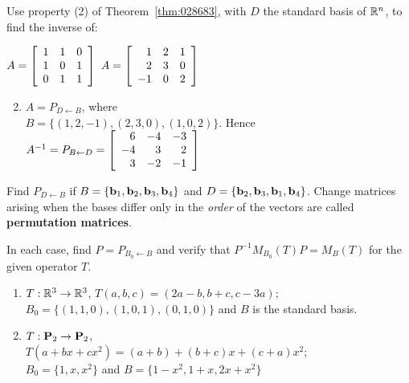 \begin{multicols}{2}
\begin{ex}
Use property (2) of Theorem~\ref{thm:028683}, with $D$ the standard basis of $\mathbb{R}^n$, to find the inverse of:
\begin{exenumerate}
\exitem $A = \left[ \begin{array}{rrr} 1 & 1 & 0 \\ 1 & 0 & 1 \\ 0 & 1 & 1 \end{array} \right]$
\exitem $A = \left[ \begin{array}{rrr} 1 & 2 & 1 \\ 2 & 3 & 0 \\ -1 & 0 & 2 \end{array} \right]$
\end{exenumerate}
\begin{sol}
\begin{enumerate}[label={\alph*.}]
\setcounter{enumi}{1}
\item $A = P_{D \gets B}$, where \\ $B = \{(1, 2, -1), (2, 3, 0), (1, 0, 2)\}$.
Hence $A^{-1} = P_{B \gets D} = \left[ \begin{array}{rrr} 6 & -4 & -3 \\ -4 & 3 & 2 \\ 3 & -2 & -1 \end{array} \right]$
\end{enumerate}
\end{sol}
\end{ex}

\begin{ex}
Find $P_{D \gets B}$ if $B = \{\textbf{b}_{1}, \textbf{b}_{2}, \textbf{b}_{3}, \textbf{b}_{4}\}$ and $D = \{\textbf{b}_{2}, \textbf{b}_{3}, \textbf{b}_{1}, \textbf{b}_{4}\}$. Change matrices arising when the bases differ only in the \textit{order} of the vectors are called \textbf{permutation matrices}.
\end{ex}

\begin{ex}
In each case, find $P = P_{B_0 \gets B}$ and verify that $P^{-1}M_{B_0}(T)P = M_B(T)$ for the given operator $T$.


\begin{enumerate}[label={\alph*.}]
\item $T : \mathbb{R}^3 \to \mathbb{R}^3$, $T(a, b, c) = (2a - b, b + c, c - 3a)$; $B_{0} = \{(1, 1, 0), (1, 0, 1), (0, 1, 0)\}$ and $B$ is the standard basis.

\item $T : \textbf{P}_2 \to \textbf{P}_2$, \\ $T(a + bx + cx^2) = (a + b) + (b + c)x + (c + a)x^2$; \\ $B_0 = \{1, x, x^2\}$ and $B = \{1 - x^2, 1 + x, 2x + x^2\}$


\end{enumerate}
\end{ex}
\end{multicols}
